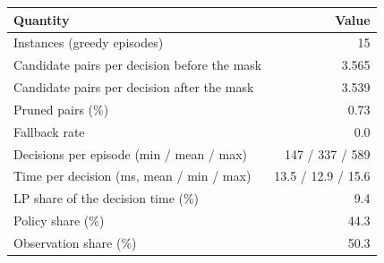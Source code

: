 \begin{tabular}{lr}
\toprule
Quantity & Value \\
\midrule
Instances (greedy episodes) & 15 \\
Candidate pairs per decision before the mask & 3.565 \\
Candidate pairs per decision after the mask & 3.539 \\
Pruned pairs (\%) & 0.73 \\
Fallback rate & 0.0 \\
Decisions per episode (min / mean / max) & 147 / 337 / 589 \\
Time per decision (ms, mean / min / max) & 13.5 / 12.9 / 15.6 \\
LP share of the decision time (\%) & 9.4 \\
Policy share (\%) & 44.3 \\
Observation share (\%) & 50.3 \\
\bottomrule
\end{tabular}
